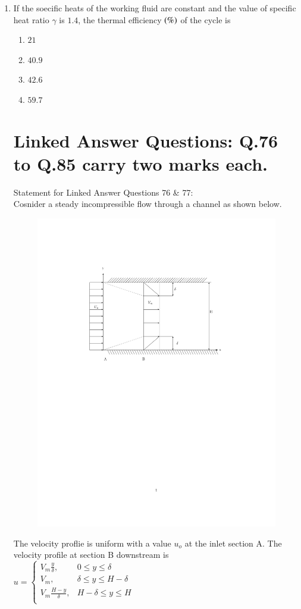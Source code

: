 \documentclass[journal,12pt,onecolumn,article]{IEEEtran}
\theoremstyle{remark}
\begin{document}
\begin{enumerate}
\begin{enumerate}
		\end{enumerate}
	\item If the soecific heats of the working fluid are constant and the value of specific heat ratio $\gamma$ is $1.4$, the thermal efficiency $\left(\%\right)$ of the cycle is 
		\begin{enumerate}
			\item $21$
			\item $40.9$
			\item $42.6$
			\item $59.7$
		\end{enumerate}
		\section*{Linked Answer Questions: Q.76 to Q.85 carry two marks each.}
		Statement for Linked Answer Questions 76 \& 77: \\
		Cosnider a steady incompressible flow through a channel as shown below. \\
			\begin{figure}[H]
	\centering
	\includegraphics[width=0.7\linewidth]{fig/fig76/main.pdf}
\end{figure}
\vspace{-180pt}

		The velocity proflie is uniform with a value $u_o$ at the inlet section A. The velocity profile at section B downstream is \\
			$u = 
			\begin{cases}
				V_m\frac{y}{\delta}, & 0\le y\le \delta \\
				V_m, & \delta \le y \le H-\delta \\
				V_m\frac{H-y}{\delta}, & H-\delta \le y \le H \\
			\end{cases}$
	

\end{enumerate}
\end{document}
